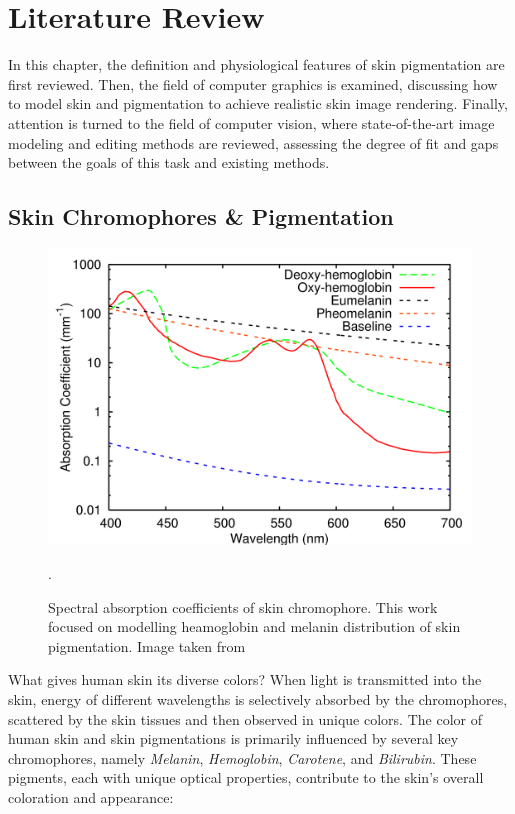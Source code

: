 
\chapter{Literature Review}
\begin{spacing}{1.5}
\setlength{\parskip}{0.3in}

In this chapter, the definition and physiological features of skin pigmentation are first reviewed. Then, the field of computer graphics is examined, discussing how to model skin and pigmentation to achieve realistic skin image rendering. Finally, attention is turned to the field of computer vision, where state-of-the-art image modeling and editing methods are reviewed, assessing the degree of fit and gaps between the goals of this task and existing methods.

\section{Skin Chromophores \& Pigmentation}
\begin{figure}
    \centering
    \includegraphics[width=0.9\columnwidth]{Chapter2/HM_abs.png}
    \caption{Spectral absorption coefficients of skin chromophore. This work focused on modelling heamoglobin and melanin distribution of skin pigmentation. Image taken from\cite{10.5555/2383894.2383946}}.
    \label{fig:hm_abs}
\end{figure}

What gives human skin its diverse colors? When light is transmitted into the skin, energy of different wavelengths is selectively absorbed by the chromophores, scattered by the skin tissues and then observed in unique colors. The color of human skin and skin pigmentations is primarily influenced by several key chromophores, namely \textit{Melanin}, \textit{Hemoglobin}, \textit{Carotene}, and \textit{Bilirubin}. These pigments, each with unique optical properties, contribute to the skin's overall coloration and appearance:


\end{spacing}
